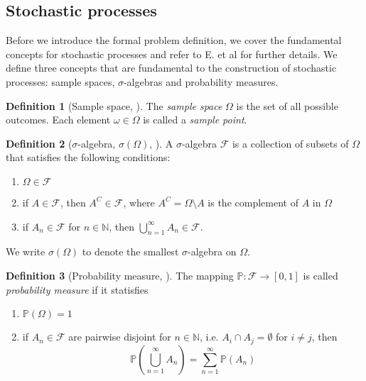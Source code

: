 \documentclass[12pt]{article}
\theoremstyle{definition}
\newtheorem{definition}[definition]{Definition}
\numberwithin{equation}{section}
\newcommand{\N}{\mathbb{N}}
\newcommand{\BP}{\mathbb{P}}
\newcommand{\CF}{\mathcal{F}}
\begin{document}
 \subsection{Stochastic processes}
 Before we introduce the formal problem definition, we cover the fundamental concepts for stochastic processes and refer to E. et al \cite{eAppliedStochasticAnalysis2021} for further details. We define three concepts that are fundamental to the construction of stochastic processes: sample spaces, $\sigma$-algebras and probability measures.
 \begin{definition}[Sample space,  ]
   The \emph{sample space} $\Omega$ is the set of all possible outcomes. Each element $\omega \in \Omega$ is called a \emph{sample point}.
 \end{definition}
 \begin{definition}[$\sigma$-algebra, $\sigma(\Omega)$, ]
   A $\sigma$-algebra $\CF$ is a collection of subsets of $\Omega$ that satisfies the following conditions:
   \begin{enumerate}[label=(\roman*)]
     \item $\Omega \in \CF$
     \item if $A \in \CF$, then $A^C \in \CF$, where $A^C = \Omega \setminus A$ is the complement of $A$ in $\Omega$
     \item if $A_n \in \CF$ for $n \in \N$, then $\bigcup_{n=1}^{\infty} A_n \in \CF$.
   \end{enumerate}
   We write $\sigma(\Omega)$ to denote the smallest $\sigma$-algebra on $\Omega$.
 \end{definition}
 \begin{definition}[Probability measure, ]
   The mapping $\BP : \CF \rightarrow [0,1]$ is called \emph{probability measure} if it statisfies
   \begin{enumerate}[label=(\roman*)]
     \item $\BP(\Omega) = 1$
     \item if $A_n \in \CF$ are pairwise disjoint for $n\in\N$, i.e. $A_i \cap A_j = \emptyset$ for $i \neq j$, then
     \begin{equation*}
       \BP(\bigcup_{n=1}^{\infty}A_n) = \sum_{n=1}^{\infty}\BP(A_n)
     \end{equation*}
   \end{enumerate}
 \end{definition}
\end{document}
